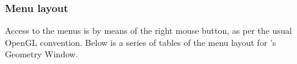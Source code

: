


\subsubsection{Menu layout}
\label{sec:control-menus}

Access to the menus is by means of the right mouse button, as per the usual
OpenGL convention.  Below is a series of tables of the menu layout for
\map{}'s Geometry Window.

